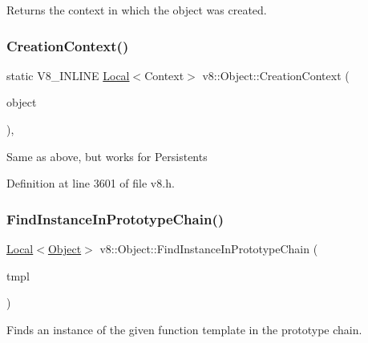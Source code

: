 Returns the context in which the object was created. \mbox{\label{classv8_1_1Object_ae958203f358c7af3727ef7179790d01f}} 
\subsubsection{\texorpdfstring{Creation\+Context()}{CreationContext()}\hspace{0.1cm}{\footnotesize\ttfamily [2/2]}}
{\footnotesize\ttfamily static V8\+\_\+\+I\+N\+L\+I\+NE \mbox{\hyperlink{classv8_1_1Local}{Local}}$<$Context$>$ v8\+::\+Object\+::\+Creation\+Context (\begin{DoxyParamCaption}\item[{const \mbox{\hyperlink{classv8_1_1PersistentBase}{Persistent\+Base}}$<$ \mbox{\hyperlink{classv8_1_1Object}{Object}} $>$ \&}]{object }\end{DoxyParamCaption})\hspace{0.3cm}{\ttfamily [inline]}, {\ttfamily [static]}}

Same as above, but works for Persistents 

Definition at line 3601 of file v8.\+h.

\mbox{\label{classv8_1_1Object_ae2ad9fee9db6e0e5da56973ebb8ea2bc}} 
\subsubsection{\texorpdfstring{Find\+Instance\+In\+Prototype\+Chain()}{FindInstanceInPrototypeChain()}}
{\footnotesize\ttfamily \mbox{\hyperlink{classv8_1_1Local}{Local}}$<$\mbox{\hyperlink{classv8_1_1Object}{Object}}$>$ v8\+::\+Object\+::\+Find\+Instance\+In\+Prototype\+Chain (\begin{DoxyParamCaption}\item[{\mbox{\hyperlink{classv8_1_1Local}{Local}}$<$ \mbox{\hyperlink{classv8_1_1FunctionTemplate}{Function\+Template}} $>$}]{tmpl }\end{DoxyParamCaption})}

Finds an instance of the given function template in the prototype chain. \mbox{\label{classv8_1_1Object_a435f68bb7ef0f64dd522c5c910682448}} 

